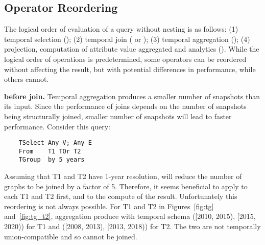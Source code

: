 \subsection{Operator Reordering}
\label{sec:sys:optimization}

The logical order of evaluation of a \ql query without nesting is as
follows: (1) temporal selection (); (2) temporal join
( or ); (3) temporal aggregation
(); (4) projection, computation of attribute value
aggregated and analytics ().  While the logical order
of operations is predetermined, some operators can be reordered
without affecting the result, but with potential differences in
performance, while others cannot. 



{\bf {} before join.}  Temporal aggregation produces a
smaller number of snapshots than its input.  Since the performance of
joins depends on the number of snapshots being structurally joined,
smaller number of snapshots will lead to faster performance.  Consider
this query:

\begin{small}
\begin{verbatim}
    TSelect Any V; Any E
    From    T1 TOr T2
    TGroup  by 5 years
\end{verbatim}
\end{small}

Assuming that T1 and T2 have 1-year resolution,  will
reduce the number of graphs to be joined by a factor of 5.  Therefore,
it seems beneficial to apply  to each T1 and T2 first,
and to the compute  of the result.  Unfortunately this
reordering is not always possible.  For T1 and T2 in
Figures~\ref{fig:tg} and~\ref{fig:tg_t2}, aggregation produce \tgs
with temporal schema ([2010, 2015), [2015, 2020)) for T1 and ([2008,
      2013), [2013, 2018)) for T2.  The two \tgs are not temporally
        union-compatible and so cannot be joined.

